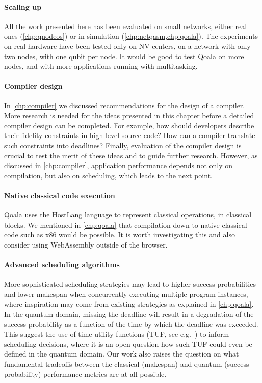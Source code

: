 \paragraph{Scaling up}
All the work presented here has been evaluated on small networks, either real ones (\cref{chp:qnodeos}) or in simulation (\cref{chp:netqasm,chp:qoala}).
The experiments on real hardware have been tested only on NV centers, on a network with only two nodes, with one qubit per node.
It would be good to test Qoala on more nodes, and with more applications running with multitasking.

\paragraph{Compiler design}
In \cref{chp:compiler} we discussed recommendations for the design of a compiler.
More research is needed for the ideas presented in this chapter before a detailed compiler design can be completed.
For example, how should developers describe their fidelity constraints in high-level source code?
How can a compiler translate such constraints into deadlines?
Finally, evaluation of the compiler design is crucial to test the merit of these ideas and to guide further research.
However, as discussed in \cref{chp:compiler}, application performance depends not only on compilation, but also on scheduling, which leads to the next point.

\paragraph{Native classical code execution}
Qoala uses the HostLang language to represent classical operations, in classical blocks.
We mentioned in \cref{chp:qoala} that compilation down to native classical code such as x86 would be possible.
It is worth investigating this and also consider using WebAssembly outside of the browser.

\paragraph{Advanced scheduling algorithms}
More sophisticated scheduling strategies may lead to higher success probabilities and lower makespan when concurrently executing multiple program instances, where inspiration may come from existing strategies as explained in \cref{chp:qoala}.
In the quantum domain, missing the deadline will result in a degradation of the success probability as a function of the time by which the deadline was exceeded.
This suggest the use of time-utility functions (TUF, see e.g.~\cite{jensen1993timeliness, li2004utility}) to inform scheduling decisions, where it is an open question how such TUF could even be defined in the quantum domain.
Our work also raises the question on what fundamental tradeoffs between the classical (makespan) and quantum (success probability) performance metrics are at all possible.


